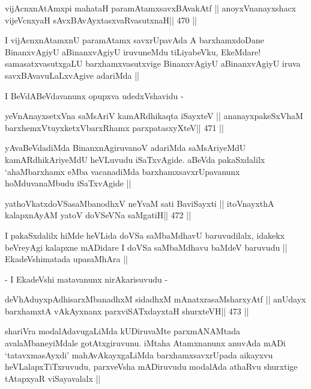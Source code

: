 \begin{shl}
vijAcnxnAtAmx\s pi mahataH paramAtamxsavxBAvakAtf ||
anoyxV\s nanayxshacx vijeVcnxyaH sAvxBAvAyxtasxvaRvasutxnaH\hfill || 470 ||
\end{shl}

\begin{artha}
I vijAcnxnAtamxnU paramAtamx savxrUpavAda A barxhamxdoDane
BinanxvAgiyU aBinanxvAgiyU iruvuneMdu tiLiyabeVku, EkeMdare!
samasatxvasutxgaLU barxhamxvasutxvige BinanxvAgiyU aBinanxvAgiyU iruva
savxBAvavuLaLxvAgive adariMda ||
\end{artha}

\begin{artha}
I BeVdABeVdavanunx opupxva udedxVshavidu -
\end{artha}

\begin{shl}
yeVnAnayxsetxVna saMsAriV kamARdhikaqta iSayxteV ||
ananayxpakeSxV\s haM barxhemxVtuyxketxVbarxRhamx parxpatasxyXteV\hfill || 471 ||
\end{shl}

\begin{artha}
yAvaBeVdadiMda BinanxnAgiruvanoV adariMda saMsAriyeMdU
kamARdhikAriyeMdU heVLuvudu iSaTxvAgide. aBeVda pakaSxdalilx
`ahaMbarxhamx eMba vacanadiMda barxhamxsavxrUpavanunx hoMduvanaMbudu
iSaTxvAgide ||
\end{artha}

\begin{shl}
yathoVkatxdoVSasaMbanodhxV neYvaM sati BaviSayxti ||
itoV\s nayxthA kalapxnAyAM yatoV doVSeVNa saMgatiH\hfill || 472 ||
\end{shl}

\begin{artha}
I pakaSxdalilx hiMde heVLida doVSa saMbaMdhavU baruvudilalx, idakekx
beVreyAgi kalapxne mADidare I doVSa saMbaMdhavu baMdeV baruvudu ||
EkadeVshimatada upasaMhAra ||
\end{artha}

\medskip
\centerline{- I EkadeVshi matavanunx nirAkarisuvudu -}

\begin{shl}
deVhAduyxpAdhisarxMbanadhxM sidadhxM mAnatxrasaMsharxyAtf ||
anUdayx barxhamxtA vAkAyxnanx parxviSATxdayxtaH shurxteVH\hfill || 473 ||
\end{shl}

\begin{artha}
shariVra modalAdavugaLiMda kUDiruvaMte parxmANAMtada avalaMbaneyiMdale
gotAtxgiruvunu. iMtaha Atamxnanunx anuvAda mADi `tatavxmasAyxdi'
mahAvAkayxgaLiMda barxhamxsavxrUpada aikayxvu heVLalapxTiTxruvudu,
parxveVsha mADiruvudu modalAda athaRvu shurxtige tAtapxyaR
viSayavalalx ||
\end{artha}


